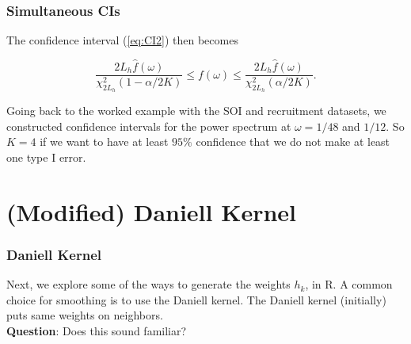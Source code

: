 \documentclass[%
xcolor=pdftex]{beamer}
\begin{document}
\begin{frame}
\frametitle{Simultaneous CIs}

The confidence interval (\ref{eq:CI2}) then becomes

\begin{equation} \label{eq:CI3}
\frac{2 L_h   \widehat{f}(\omega)}{{\chi_{2L_h}^2(1-\alpha/2K)}} \leq f(\omega) \leq \frac{2 L_h  \widehat{f}(\omega) }{{\chi_{2L_h}^2(\alpha/2K)}} .
\end{equation}

Going back to the worked example with the SOI and recruitment datasets, we constructed confidence intervals for the power spectrum at $\omega = 1/48$ and $1/12$. So $K=4$ if we want to have at least $95\%$ confidence that we do not make at least one type I error.

\end{frame}




\section{(Modified) Daniell Kernel}
\frame{\tableofcontents[currentsection]}

\begin{frame}
\frametitle{Daniell Kernel}

Next, we explore some of the ways to generate the weights $h_k$, in R. A common choice for smoothing is to use the Daniell kernel. The Daniell kernel (initially) puts same
weights on neighbors.\\
\vspace{5mm}
\textbf{Question}: Does this sound familiar?

\end{frame}
\end{document}

